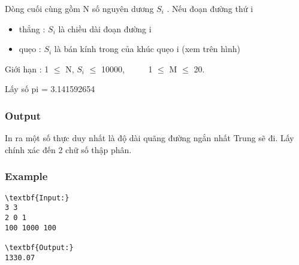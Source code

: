 Dòng cuối cùng gồm N số nguyên dương $S_{i}$ . Nếu đoạn đường thứ i
\begin{itemize}
	\item thẳng : $S_{i}$ là chiều dài đoạn đường i
	\item quẹo : $S_{i}$ là bán kính trong của khúc quẹo i (xem trên hình)
\end{itemize}

Giới hạn : 1  $\le$  N, $S_{i}$  $\le$  10000,       1  $\le$  M  $\le$  20.

Lấy số pi = 3.141592654

\subsubsection{Output}

In ra một số thực duy nhất là độ dài quãng đường ngắn nhất Trung sẽ đi. Lấy chính xác đến 2 chữ số thập phân.

\subsubsection{Example}
\begin{verbatim}
\textbf{Input:}
3 3
2 0 1
100 1000 100

\textbf{Output:}
1330.07\end{verbatim}
